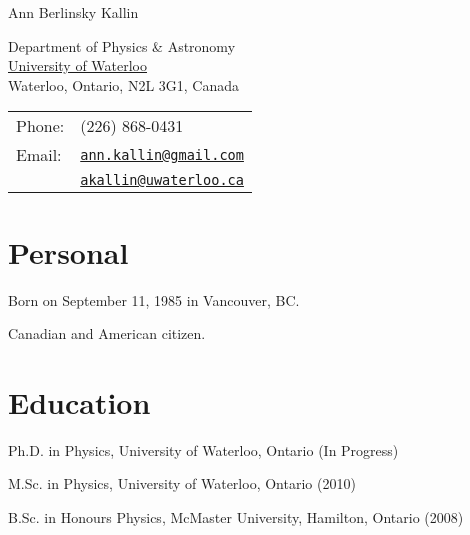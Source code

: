 \documentclass[letterpaper]{article}
\def\name{Ann Berlinsky Kallin}
\renewenvironment{itemize}{
  \begin{list}{}{
    \setlength{\leftmargin}{1.5em}
  }
}{
  \end{list}
}
\begin{document}
{\huge \name}


\vspace{0.25in}

\begin{minipage}{0.45\linewidth}
  Department of Physics \& Astronomy \\
  \href{http://uwaterloo.ca/}{University of Waterloo} \\
  Waterloo, Ontario, N2L 3G1, Canada
\end{minipage}
\begin{minipage}{0.45\linewidth}
  \begin{tabular}{ll}
    Phone: & (226) 868-0431 \\
    Email: & \href{mailto:ann.kallin@gmail.com}{\tt ann.kallin@gmail.com} \\
                & \href{mailto:akallin@uwaterloo.ca}{\tt akallin@uwaterloo.ca} \\
   
  \end{tabular}
\end{minipage}


\section*{Personal}

\begin{itemize}
\item Born on September 11, 1985 in Vancouver, BC.
\item Canadian and American citizen.
\end{itemize}


\section*{Education}

\begin{itemize}
	\item Ph.D. in Physics, University of Waterloo, Ontario (In Progress)
  	\item M.Sc. in Physics, University of Waterloo, Ontario (2010)
	\item B.Sc. in Honours Physics, McMaster University, Hamilton, Ontario (2008)
\end{itemize}
\end{document}
